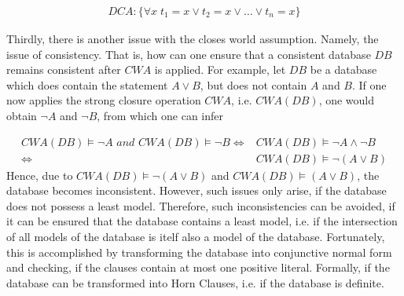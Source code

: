 \documentclass{article}
\begin{document}
\begin{equation*}
\begin{split}
DCA : \{\forall x \; t_1 = x \vee t_2 = x \vee \dots \vee t_n = x\}
\end{split}
\end{equation*}

Thirdly, there is another issue with the closes world assumption. Namely, the issue of consistency. That is, how can one ensure that a consistent database $DB$ remains consistent after $\textit{CWA}$ is applied. For example, let $DB$ be a database which does contain the statement $A \vee B$, but does not contain $A$ and $B$. If one now applies the strong closure operation $\textit{CWA}$, i.e. $\textit{CWA}(DB)$, one would obtain $\neg A$ and $\neg B$, from which one can infer

\begin{equation*}
\begin{split}
\textit{CWA}(DB) \models \neg A \textit{ and } \textit{CWA}(DB)\models \neg B 
\iff &\textit{CWA}(DB)\models \neg A \wedge \neg B  \\
\iff &\textit{CWA}(DB)\models \neg (A \vee  B) 
\end{split}
\end{equation*}
Hence, due to $\textit{CWA}(DB)\models \neg (A \vee  B)$ and $\textit{CWA}(DB)\models (A \vee  B)$, the database becomes inconsistent.
However, such issues only arise, if the database does not possess a least model.
Therefore, such inconsistencies can be avoided, if it can be ensured that the database contains a least model, i.e. if the intersection of all models of the database is itelf also a model of the database. Fortunately, this is accomplished by transforming the database into conjunctive normal form and checking, if the clauses contain at most one positive literal. Formally, if the database can be transformed into Horn Clauses, i.e. if the database is definite.\cite{BOCHMAN2007557, brewka1997nonmonotonic, reiter1981closed} \\
\end{document}
